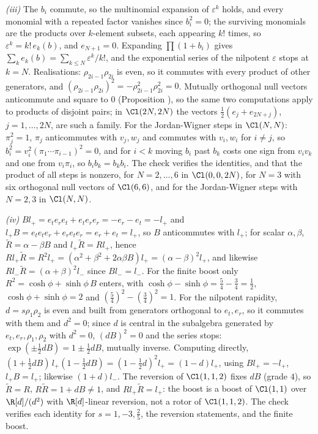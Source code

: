 \emph{(iii)} The $b_{i}$ commute, so the multinomial expansion of $\varepsilon^{k}$ holds, and every monomial with a repeated factor vanishes since $b_{i}^{2} = 0$; the surviving monomials are the products over $k$-element subsets, each appearing $k!$ times, so $\varepsilon^{k} = k!\,e_{k}(b)$, and $e_{N+1} = 0$. Expanding $\prod(1 + b_{i})$ gives $\sum_{k}e_{k}(b) = \sum_{k \le N}\varepsilon^{k}/k!$, and the exponential series of the nilpotent $\varepsilon$ stops at $k = N$. Realisations: $\rho_{2i-1}\rho_{2i}$ is even, so it commutes with every product of other generators, and $(\rho_{2i-1}\rho_{2i})^{2} = -\rho_{2i-1}^{2}\rho_{2i}^{2} = 0$. Mutually orthogonal null vectors anticommute and square to $0$ (Proposition ), so the same two computations apply to products of disjoint pairs; in $\Cl(2N,2N)$ the vectors $\tfrac12(e_{j} + e_{2N+j})$, $j = 1, \dots, 2N$, are such a family. For the Jordan-Wigner steps in $\Cl(N,N)$: $\pi_{j}^{2} = 1$, $\pi_{j}$ anticommutes with $v_{j}, w_{j}$ and commutes with $v_{i}, w_{i}$ for $i \ne j$, so $b_{i}^{2} = v_{i}^{2}(\pi_{1}\cdots\pi_{i-1})^{2} = 0$, and for $i < k$ moving $b_{i}$ past $b_{k}$ costs one sign from $v_{i}v_{k}$ and one from $v_{i}\pi_{i}$, so $b_{i}b_{k} = b_{k}b_{i}$. The check verifies the identities, and that the product of all steps is nonzero, for $N = 2, \dots, 6$ in $\Cl(0,0,2N)$, for $N = 3$ with six orthogonal null vectors of $\Cl(6,6)$, and for the Jordan-Wigner steps with $N = 2, 3$ in $\Cl(N,N)$.

\emph{(iv)} $Bl_{+} = e_{t}e_{r}e_{t} + e_{t}e_{r}e_{r} = -e_{r} - e_{t} = -l_{+}$ and $l_{+}B = e_{t}e_{t}e_{r} + e_{r}e_{t}e_{r} = e_{r} + e_{t} = l_{+}$, so $B$ anticommutes with $l_{+}$; for scalar $\alpha, \beta$, $\widetilde{R} = \alpha - \beta B$ and $l_{+}\widetilde{R} = Rl_{+}$, hence $Rl_{+}\widetilde{R} = R^{2}l_{+} = (\alpha^{2} + \beta^{2} + 2\alpha\beta B)l_{+} = (\alpha - \beta)^{2}l_{+}$, and likewise $Rl_{-}\widetilde{R} = (\alpha + \beta)^{2}l_{-}$ since $Bl_{-} = l_{-}$. For the finite boost only $R^{2} = \cosh\phi + \sinh\phi\,B$ enters, with $\cosh\phi - \sinh\phi = \tfrac54 - \tfrac34 = \tfrac12$, $\cosh\phi + \sinh\phi = 2$ and $(\tfrac54)^{2} - (\tfrac34)^{2} = 1$. For the nilpotent rapidity, $d = s\rho_{1}\rho_{2}$ is even and built from generators orthogonal to $e_{t}, e_{r}$, so it commutes with them and $d^{2} = 0$; since $d$ is central in the subalgebra generated by $e_{t}, e_{r}, \rho_{1}, \rho_{2}$ with $d^{2} = 0$, $(dB)^{2} = 0$ and the series stops: $\exp(\pm\tfrac12 dB) = 1 \pm \tfrac12 dB$, mutually inverse. Computing directly, $(1 + \tfrac12 dB)\,l_{+}(1 - \tfrac12 dB) = (1 - \tfrac12 d)^{2}l_{+} = (1 - d)l_{+}$, using $Bl_{+} = -l_{+}$, $l_{+}B = l_{+}$; likewise $(1 + d)l_{-}$. The reversion of $\Cl(1,1,2)$ fixes $dB$ (grade $4$), so $\widetilde{R} = R$, $R\widetilde{R} = 1 + dB \ne 1$, and $Rl_{+}\widetilde{R} = l_{+}$: the boost is a boost of $\Cl(1,1)$ over $\R[d]/(d^{2})$ with $\R[d]$-linear reversion, not a rotor of $\Cl(1,1,2)$. The check verifies each identity for $s = 1, -3, \tfrac25$, the reversion statements, and the finite boost.
